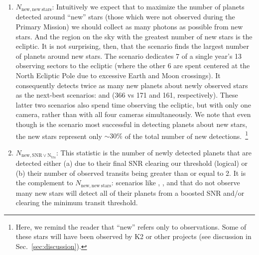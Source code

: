 \begin{enumerate}
	
	\item $N_\mathrm{new,new\ stars}$:
	  Intuitively we expect that to maximize the number of planets detected 
	  around ``new'' stars (those which were not observed during the Primary 
	  Mission) we should collect as many photons as possible from new stars.
         And the region on the sky with the greatest number of new stars is the ecliptic.
	 It is not surprising, then, that the \elong\:scenario finds the largest number of planets around new stars.
         The \elong\:scenario dedicates 7 of a single year's 13 observing sectors to the ecliptic (where the other 6 are spent centered at the North Ecliptic Pole due to excessive Earth and Moon crossings).
	It consequently detects twice as many new planets about newly observed stars as the next-best scenarios: \eshort\:and \shemiAvoid\:(366 vs 171 and 161, respectively).
	These latter two scenarios also spend time observing the ecliptic, but with 
	only one camera, rather than with all four cameras simultaneously.
	We note that even though \elong\:is the scenario most successful in detecting planets about new stars, the new stars represent only $\sim\!30\%$ of the total number of new detections.~\footnote{Here, we remind the reader that ``new'' refers only to \tess observations. Some of these stars will
          have been observed by K2 or other projects (see discussion in Sec.~\ref{sec:discussion}).}

	\item $N_\mathrm{new,SNR\lor N_{tra}}$:
	This statistic is the number of newly detected planets that are detected either (a) due to their final SNR clearing our threshold (logical) or (b) their number of observed transits being greater than or equal to 2.
	It is the complement to $N_\mathrm{new,new\ stars}$: scenarios like \nhemi, \npole, and \hemis\:that do not observe many new stars will detect all of their planets from a boosted SNR and/or clearing the minimum transit threshold.
	
\end{enumerate}


